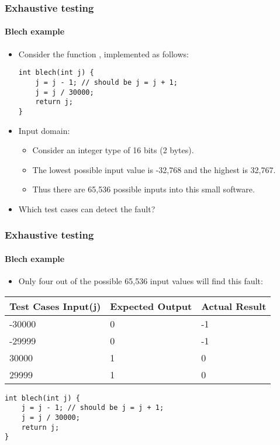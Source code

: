 \begin{frame}[hasprev=false, hasnext=true, fragile]
\label{example:blech-exhaustive-testing}
\frametitle{Exhaustive testing}
\framesubtitle{Blech example}

\begin{itemize}
	\item Consider the function , implemented as follows:
\begin{lstlisting}
int blech(int j) {
    j = j - 1; // should be j = j + 1;
    j = j / 30000;
    return j;
}
\end{lstlisting}

	\item Input domain:
	\begin{itemize}
		\item Consider an integer type of 16 bits (2 bytes).

		\item The lowest possible input value is -32,768 and the highest is
		32,767.

		\item Thus there are 65,536 possible inputs into this small software.
	\end{itemize}

	\item Which test cases can detect the fault?
\end{itemize}
\end{frame}



\begin{frame}[hasprev=true, hasnext=false, fragile]
\frametitle{Exhaustive testing}
\framesubtitle{Blech example}

\begin{itemize}
	\item Only four out of the possible 65,536 input values will find this
	fault:
\end{itemize}

\begin{table}
    \centering
	\small
    \begin{tabular}{|l|l|l|}
	\hline
	Test Cases Input(j)	& Expected Output	& Actual Result \\
	\hline
	-30000 & 0 & -1\\
	\hline
	-29999 & 0 & -1\\
	\hline
	30000 & 1 & 0\\
	\hline
	29999 & 1 & 0\\
	\hline
    \end{tabular}
\end{table}

\begin{lstlisting}
int blech(int j) {
    j = j - 1; // should be j = j + 1;
    j = j / 30000;
    return j;
}
\end{lstlisting}
\end{frame}

